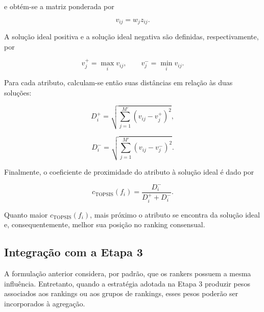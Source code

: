 e obtém-se a matriz ponderada por

\begin{equation}
    v_{ij}=w_jz_{ij}.
    \label{eq:topsis-ponderacao-ac-efs}
\end{equation}

A solução ideal positiva e a solução ideal negativa são definidas,
respectivamente, por

\begin{equation}
    v_j^{+}
    =
    \max_i v_{ij},
    \qquad
    v_j^{-}
    =
    \min_i v_{ij}.
    \label{eq:topsis-ideais-ac-efs}
\end{equation}

Para cada atributo, calculam-se então suas distâncias em relação às duas
soluções:

\begin{equation}
    D_i^{+}
    =
    \sqrt{
        \sum_{j=1}^{M'}
        \left(v_{ij}-v_j^{+}\right)^2
    },
\end{equation}

\begin{equation}
    D_i^{-}
    =
    \sqrt{
        \sum_{j=1}^{M'}
        \left(v_{ij}-v_j^{-}\right)^2
    }.
\end{equation}

Finalmente, o coeficiente de proximidade do atributo à solução ideal é dado
por

\begin{equation}
    c_{\mathrm{TOPSIS}}(f_i)
    =
    \frac{D_i^{-}}
    {D_i^{+}+D_i^{-}}.
    \label{eq:topsis-score-ac-efs}
\end{equation}

Quanto maior $c_{\mathrm{TOPSIS}}(f_i)$, mais próximo o atributo se encontra
da solução ideal e, consequentemente, melhor sua posição no ranking consensual.


\subsection{Integração com a Etapa 3}
\label{subsec:ac-efs-agregacao-ponderada}

A formulação anterior considera, por padrão, que os rankers possuem a mesma
influência. Entretanto, quando a estratégia adotada na Etapa 3 produzir pesos
associados aos rankings ou aos grupos de rankings, esses pesos poderão ser
incorporados à agregação.

